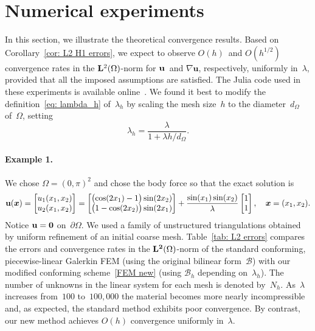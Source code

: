 \documentclass[11pt]{article}
\newcommand{\calB}{\mathcal{B}}
\newcommand{\vu}{{\bf u}}
\newcommand{\bsx}{{\boldsymbol{x}}}
\numberwithin{equation}{section}
\begin{document}
\section{Numerical experiments}\label{Sec: Numeric}
In this section, we illustrate the theoretical convergence results. Based on 
Corollary~\ref{cor: L2 H1 errors}, we expect to observe $O(h)$~and $O(h^{1/2})$
convergence rates in the ${\bf L}^2(\Omega)$-norm for ${\bf u}$~and
$\nabla\mathbf{u}$, respectively, uniformly in~$\lambda$, provided that all the
imposed assumptions are  satisfied.   The Julia code used in these experiments
is available online~\cite{McLean2024}.  We found it best to modify the
definition~\eqref{eq: lambda_h} of~$\lambda_h$ by scaling the mesh size~$h$ to
the diameter~$d_\Omega$ of~$\Omega$, setting
\begin{equation}\label{eq: lambda_h d_Omega}
\lambda_h=\frac{\lambda}{1+\lambda h/d_\Omega}.
\end{equation}

\paragraph{Example 1.} We chose  $\Omega=(0,\pi)^2$ and chose the body force so
that the exact solution is
\[
\vu(\boldsymbol{x})=\begin{bmatrix}  u_1(x_1,x_2)\\  u_2(x_1,x_2)\end{bmatrix}
=\begin{bmatrix}
\bigl(\cos(2x_1)-1\bigr)\sin(2x_2)\\ \bigl(1-\cos(2x_2)\bigr)\sin(2x_1)
\end{bmatrix}
+\frac{\sin(x_1)\sin(x_2)}{\lambda}\begin{bmatrix}1\\ 1\end{bmatrix},
\quad\bsx=(x_1,x_2).
\]
Notice $\vu=\mathbf{0}$ on~$\partial\Omega$.  We used a family of unstructured
triangulations obtained by uniform refinement of an initial coarse mesh.
Table~\ref{tab: L2 errors} compares the errors and convergence rates in the
${\bf L^2}(\Omega)$-norm of the standard conforming, piecewise-linear
Galerkin FEM (using the original bilinear form~$\calB$) with our modified
conforming scheme~\eqref{FEM new} (using $\calB_h$ depending on~$\lambda_h$).
The number of unknowns in the linear system for each mesh is denoted by~$N_h$.
As~$\lambda$ increases from~$100$ to~$100{,}000$ the material becomes more
nearly incompressible and, as expected, the standard method exhibits poor
convergence. By contrast, our new method achieves $O(h)$ convergence uniformly
in~$\lambda$.
   
\end{document}
